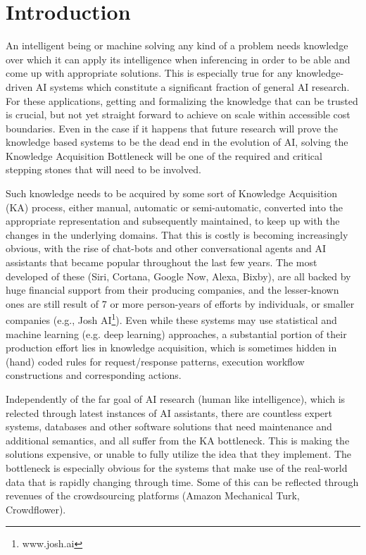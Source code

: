 % 
\chapter{Introduction}
An intelligent being or machine solving any kind of a problem needs knowledge 
over which it can apply its intelligence when inferencing in order to be able
and come up with appropriate solutions. This is especially true for any 
knowledge-driven AI systems which constitute a significant fraction of general 
AI research. For these applications, getting and formalizing the knowledge that
can be trusted is crucial, but not yet straight forward to achieve on scale 
within accessible cost boundaries. Even in the case if it happens that future 
research will prove the knowledge based systems to be the dead end in the
evolution of AI, solving the Knowledge Acquisition 
Bottleneck\parencite{Wagner2006} will be one of the required and critical 
stepping stones that will need to be involved.

Such knowledge needs to be acquired by some sort of Knowledge Acquisition (KA) 
process, either manual, automatic or semi-automatic, converted into the
appropriate representation and subsequently maintained, to keep up with the
changes in the underlying domains. That this is costly is becoming 
increasingly obvious, with the rise of chat-bots and other conversational 
agents and AI assistants that became popular throughout the last few years. 
The most developed of these (Siri, Cortana, Google Now, Alexa, Bixby), are 
all backed by huge financial support from their producing companies, and the 
lesser-known ones are still result of 7 or more person-years of efforts by
individuals\parencite{Wilcox2011, Wallace2013}, or smaller companies (e.g.,
Josh AI\footnote{www.josh.ai}). Even while these systems may use statistical
and machine learning (e.g. deep learning) approaches, a substantial 
portion of their production effort lies in knowledge acquisition, which is 
sometimes hidden in (hand) coded rules for request/response patterns, execution
workflow constructions and corresponding actions.

Independently of the far goal of AI research (human like intelligence), which
is relected through latest instances of AI assistants, there are countless 
expert systems, databases and other software solutions that need maintenance
and additional semantics, and all suffer from the KA bottleneck. This is making
the solutions expensive, or unable to fully utilize the idea that they 
implement. The bottleneck is especially obvious for the systems that make use 
of the real-world data that is rapidly changing through time. Some of this can
be reflected through revenues of the crowdsourcing platforms (Amazon Mechanical
Turk, Crowdflower).


